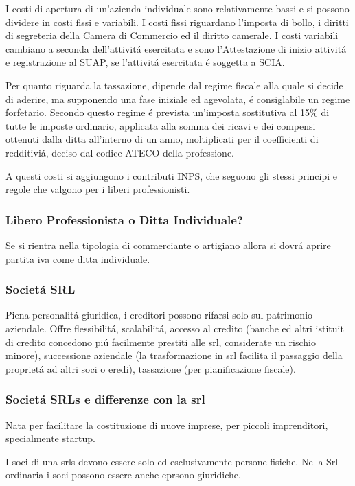 \documentclass{article}
\begin{document}
I costi di apertura di un'azienda individuale sono relativamente bassi e si possono dividere in costi fissi e variabili. 
I costi fissi riguardano l'imposta di bollo, i diritti di segreteria della Camera di Commercio ed il diritto camerale. 
I costi variabili cambiano a seconda dell'attivit\'a esercitata e sono l'Attestazione di inizio attivit\'a e registrazione al SUAP, se l'attivit\'a esercitata \'e soggetta a SCIA.

Per quanto riguarda la tassazione, dipende dal regime fiscale alla quale si decide di aderire, ma supponendo una fase iniziale ed agevolata, \'e consiglabile un regime forfetario.
Secondo questo regime \'e prevista un'imposta sostitutiva al 15\% di tutte le imposte ordinario, applicata alla somma dei ricavi e dei compensi ottenuti dalla ditta all'interno di un anno, moltiplicati per il coefficienti di redditivi\'a, deciso dal codice ATECO della professione. 

A questi costi si aggiungono i contributi INPS, che seguono gli stessi principi e regole che valgono per i liberi professionisti.

\subsubsection{Libero Professionista o Ditta Individuale?}
Se si rientra nella tipologia di commerciante o artigiano allora si dovr\'a aprire partita iva come ditta individuale.

\subsubsection{Societ\'a SRL}
Piena personalit\'a  giuridica, i creditori possono rifarsi solo sul patrimonio aziendale. 
Offre flessibilit\'a, scalabilit\'a, 
accesso al credito (banche ed altri istituit di credito concedono pi\'u facilmente prestiti alle srl, considerate un rischio minore), 
successione aziendale (la trasformazione in srl facilita il passaggio della propriet\'a ad altri soci o eredi), tassazione (per pianificazione fiscale).

\subsubsection{Societ\'a SRLs e differenze con la srl}
Nata per facilitare la costituzione di nuove imprese, per piccoli imprenditori, specialmente startup.

I soci di una srls devono essere solo ed esclusivamente persone fisiche. Nella Srl ordinaria i soci possono essere anche eprsono giuridiche.
\end{document}
